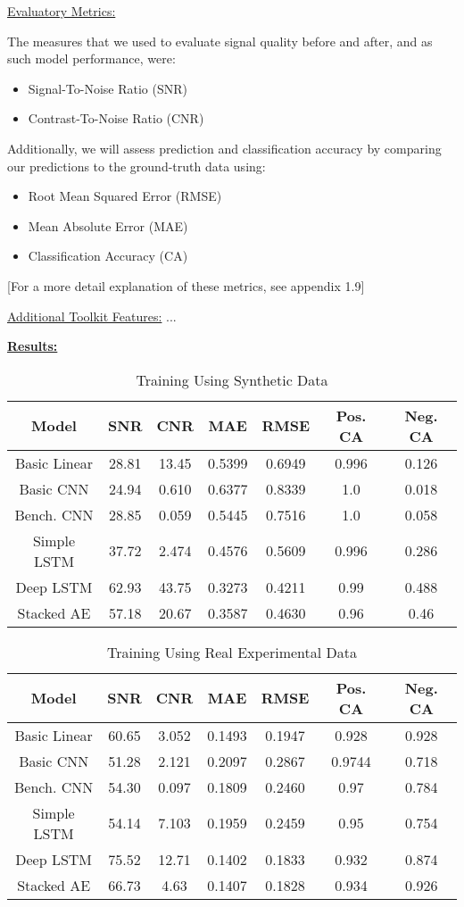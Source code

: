 \documentclass[9pt]{article}
\begin{document}
\ul{Evaluatory Metrics:}

The measures that we used to evaluate signal quality before and after, and as such model performance, were:
\begin{itemize}
    \item Signal-To-Noise Ratio (SNR) 
    \item Contrast-To-Noise Ratio (CNR)
\end{itemize}

Additionally, we will assess prediction and classification accuracy by comparing our predictions to the ground-truth data using:
\begin{itemize}
    \item Root Mean Squared Error (RMSE)
    \item Mean Absolute Error (MAE)
    \item Classification Accuracy (CA)
\end{itemize}

[For a more detail explanation of these metrics, see appendix 1.9]

\ul{Additional Toolkit Features:}
...

\underline{\textbf{Results:}}

\begin{table}[h]
\centering
\begin{tabular}{|c|c|c|c|c|c|c|}
\hline
Model & SNR & CNR & MAE & RMSE & Pos. CA & Neg. CA \\
\hline
Basic Linear & 28.81 & 13.45 & 0.5399& 0.6949 & 0.996 & 0.126 \\
Basic CNN &24.94&0.610&0.6377&0.8339&1.0&0.018\\
Bench. CNN &28.85&0.059&0.5445&0.7516&1.0&0.058\\
Simple LSTM &37.72&2.474&0.4576&0.5609&0.996&0.286\\
Deep LSTM &62.93&43.75&0.3273&0.4211&0.99&0.488\\
Stacked AE &57.18&20.67&0.3587&0.4630&0.96&0.46\\
\end{tabular}
\caption{Training Using Synthetic Data}
\end{table}

\begin{table}[h]
\centering
\begin{tabular}{|c|c|c|c|c|c|c|}
\hline
Model & SNR & CNR & MAE & RMSE & Pos. CA & Neg. CA \\
\hline
Basic Linear &60.65&3.052&0.1493&0.1947&0.928&0.928\\
Basic CNN &51.28&2.121&0.2097&0.2867&0.9744&0.718\\
Bench. CNN &54.30&0.097&0.1809&0.2460&0.97&0.784\\
Simple LSTM &54.14&7.103&0.1959&0.2459&0.95&0.754\\
Deep LSTM &75.52&12.71&0.1402&0.1833&0.932&0.874\\
Stacked AE &66.73&4.63&0.1407&0.1828&0.934&0.926\\
\end{tabular}
\caption{Training Using Real Experimental Data}
\end{table}
\end{document}
